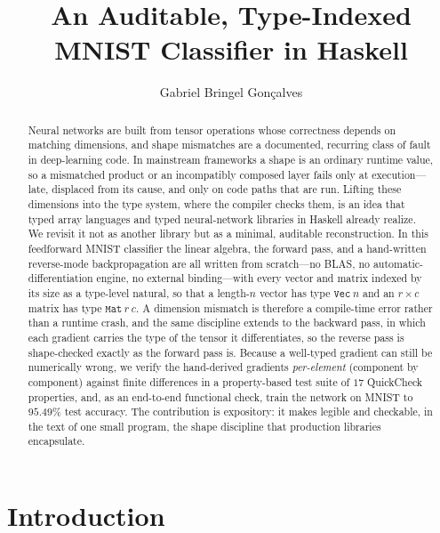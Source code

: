 \documentclass[sigconf,nonacm]{acmart}
\title{An Auditable, Type-Indexed MNIST Classifier in Haskell}
\author{Gabriel Bringel Gonçalves}
\affiliation{%
  \institution{Universidade Federal da Paraíba}
  \city{João Pessoa, PB}
  \country{Brazil}}
\begin{document}
\begin{abstract}
Neural networks are built from tensor operations whose correctness depends on
matching dimensions, and shape mismatches are a documented, recurring class of
fault in deep-learning code. In mainstream frameworks a shape is an ordinary
runtime value, so a mismatched product or an incompatibly composed layer fails
only at execution---late, displaced from its cause, and only on code paths that
are run. Lifting these dimensions into the type system, where the compiler
checks them, is an idea that typed array languages and typed neural-network
libraries in Haskell already realize. We revisit it not as another library but
as a minimal, auditable reconstruction. In this feedforward MNIST classifier the
linear algebra, the forward pass, and a hand-written reverse-mode
backpropagation are all written from scratch---no BLAS, no
automatic-differentiation engine, no external binding---with every vector and
matrix indexed by its size as a type-level natural, so that a length-$n$ vector
has type $\mathtt{Vec}\ n$ and an $r\times c$ matrix has type
$\mathtt{Mat}\ r\ c$. A dimension mismatch is therefore a compile-time error
rather than a runtime crash, and the same discipline extends to the backward
pass, in which each gradient carries the type of the tensor it differentiates,
so the reverse pass is shape-checked exactly as the forward pass is. Because a
well-typed gradient can still be numerically wrong, we verify the hand-derived
gradients \emph{per-element} (component by component) against finite differences
in a property-based test suite of $17$ QuickCheck properties, and, as an
end-to-end functional check, train the network on MNIST to $95.49\%$ test
accuracy. The contribution is expository: it makes legible and
checkable, in the text of one small program, the shape discipline that
production libraries encapsulate.
\end{abstract}

\maketitle

\section{Introduction}
\label{sec:introduction}
\end{document}
